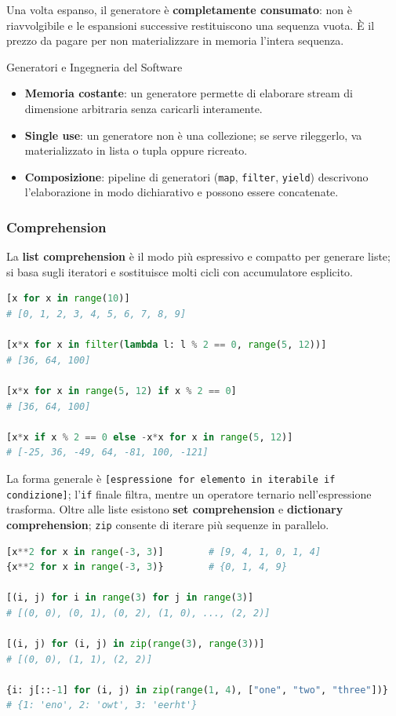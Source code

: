 \documentclass[12pt]{extarticle}
\begin{document}
\noindent Una volta espanso, il generatore è \textbf{completamente consumato}: non è riavvolgibile e le espansioni successive restituiscono una sequenza vuota. È il prezzo da pagare per non materializzare in memoria l'intera sequenza.

\begin{cbox}{Generatori e Ingegneria del Software}
\begin{itemize}
    \item \textbf{Memoria costante}: un generatore permette di elaborare stream di dimensione arbitraria senza caricarli interamente.
    \item \textbf{Single use}: un generatore non è una collezione; se serve rileggerlo, va materializzato in lista o tupla oppure ricreato.
    \item \textbf{Composizione}: pipeline di generatori (\texttt{map}, \texttt{filter}, \texttt{yield}) descrivono l'elaborazione in modo dichiarativo e possono essere concatenate.
\end{itemize}
\end{cbox}

\subsubsection{Comprehension}

\noindent La \textbf{list comprehension} è il modo più espressivo e compatto per generare liste; si basa sugli iteratori e sostituisce molti cicli con accumulatore esplicito.

\begin{lstlisting}[language=Python]
[x for x in range(10)]
# [0, 1, 2, 3, 4, 5, 6, 7, 8, 9]

[x*x for x in filter(lambda l: l % 2 == 0, range(5, 12))]
# [36, 64, 100]

[x*x for x in range(5, 12) if x % 2 == 0]
# [36, 64, 100]

[x*x if x % 2 == 0 else -x*x for x in range(5, 12)]
# [-25, 36, -49, 64, -81, 100, -121]
\end{lstlisting}

\noindent La forma generale è \texttt{[espressione for elemento in iterabile if condizione]}; l'\texttt{if} finale filtra, mentre un operatore ternario nell'espressione trasforma. Oltre alle liste esistono \textbf{set comprehension} e \textbf{dictionary comprehension}; \texttt{zip} consente di iterare più sequenze in parallelo.

\begin{lstlisting}[language=Python]
[x**2 for x in range(-3, 3)]        # [9, 4, 1, 0, 1, 4]
{x**2 for x in range(-3, 3)}        # {0, 1, 4, 9}

[(i, j) for i in range(3) for j in range(3)]
# [(0, 0), (0, 1), (0, 2), (1, 0), ..., (2, 2)]

[(i, j) for (i, j) in zip(range(3), range(3))]
# [(0, 0), (1, 1), (2, 2)]

{i: j[::-1] for (i, j) in zip(range(1, 4), ["one", "two", "three"])}
# {1: 'eno', 2: 'owt', 3: 'eerht'}
\end{lstlisting}
\end{document}
